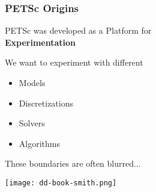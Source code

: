 

\begin{frame}[fragile]
\frametitle{PETSc Origins}
 
 \begin{center} \LARGE
  PETSc was developed as a Platform for \\[0.2em] \textbf{\color{ddviolet} Experimentation}
 \end{center}

 \vspace{1cm}
 \begin{block}{We want to experiment with different}
 \begin{itemize}
  \item Models
  \item Discretizations
  \item Solvers
  \item Algorithms
 \end{itemize}
 \end{block}

 \begin{block}{These boundaries are often blurred...}
 \end{block}

 \begin{flushright}
  \vspace*{-5cm}
  \texttt{[image: dd-book-smith.png]}
 \end{flushright}

\end{frame}

